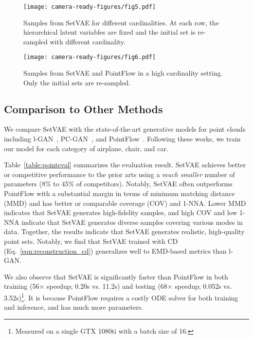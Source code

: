 \documentclass[final]{arxiv/cvpr}
\begin{document}
\begin{figure}[!t]
    \centering
    \texttt{[image: camera-ready-figures/fig5.pdf]}
    \vspace{-0.7cm}
    \caption{
    Samples from SetVAE for different cardinalities. At each row, the hierarchical latent variables are fixed and the initial set is re-sampled with different cardinality.
    }
    \label{fig:cardinality}
    \vspace{-0.5cm}
\end{figure}
\begin{figure}[!t]
    \centering
    \texttt{[image: camera-ready-figures/fig6.pdf]}
    \vspace{-0.15cm}
    \caption{
    Samples from SetVAE and PointFlow in a high cardinality setting. Only the initial sets are re-sampled.
    }
    \label{fig:mega-cardinality}
    \vspace{-0.5cm}
\end{figure}

\subsection{Comparison to Other Methods}
We compare SetVAE with the state-of-the-art generative models for point clouds including l-GAN~\cite{achlioptas2018learning}, PC-GAN~\cite{li2018point}, and PointFlow~\cite{yang2019pointflow}.
Following these works, we train our model for each category of airplane, chair, and car.


Table~\ref{table:pointeval} summarizes the evaluation result.
SetVAE achieves better or competitive performance to the prior arts using a \emph{much smaller} number of parameters ($8\%$ to $45\%$ of competitors).
Notably, SetVAE often outperforms PointFlow with a substantial margin in terms of minimum matching distance (MMD) and has better or comparable coverage (COV) and 1-NNA.
Lower MMD indicates that SetVAE generates high-fidelity samples, and high COV and low 1-NNA indicate that SetVAE generates diverse samples covering various modes in data.
Together, the results indicate that SetVAE generates realistic, high-quality point sets.
Notably, we find that SetVAE trained with CD (Eq.~\eqref{eqn:reconstruction_cd}) generalizes well to EMD-based metrics than l-GAN.

We also observe that SetVAE is significantly faster than PointFlow in both training (56$\times$ speedup; 0.20s vs. 11.2s) and testing (68$\times$ speedup; 0.052s vs. 3.52s)\footnote{Measured on a single GTX 1080ti with a batch size of 16.}.
It is because PointFlow requires a costly ODE solver for both training and inference, and has much more parameters.
\end{document}
